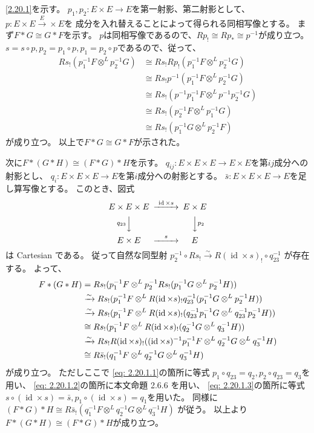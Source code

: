 \documentclass[uplatex,dvipdfmx]{jsarticle}
\makeatletter
\theoremstyle{definition}
\renewenvironment{proof}[1][\proofname]{
  \pushQED{\qed}%
  \normalfont \topsep6\p@\@plus6\p@\relax
  \trivlist
  \item[\hskip\labelsep
    #1\@addpunct{\textbf{.}}]\ignorespaces
}{%
  \popQED\endtrivlist\@endpefalse
}
\providecommand{\proofname}{証明}
\DeclareMathOperator{\id}{\mathrm{id}}
\makeatother
\begin{document}
\begin{proof}
  \ref{2.20.1}を示す。
  \(p_1,p_2:E\times E\to E\)を第一射影、第二射影として、
  \(p:E\times E\xrightarrow E\times E\)を
  成分を入れ替えることによって得られる同相写像とする。
  まず\(F*G\cong G*F\)を示す。
  \(p\)は同相写像であるので、\(Rp_! \cong Rp_*\cong p^{-1}\)が成り立つ。
  \(s = s\circ p, p_2 = p_1\circ p, p_1 = p_2\circ p\)であるので、従って、
  \begin{align*}
    Rs_!(p_1^{-1}F\otimes^L p_2^{-1}G)
    &\cong Rs_!Rp_!(p_1^{-1}F\otimes^L p_2^{-1}G) \\
    &\cong Rs_!p^{-1}(p_1^{-1}F\otimes^L p_2^{-1}G) \\
    &\cong Rs_!(p^{-1}p_1^{-1}F\otimes^L p^{-1}p_2^{-1}G) \\
    &\cong Rs_!(p_2^{-1}F\otimes^L p_1^{-1}G) \\
    &\cong Rs_!(p_1^{-1}G\otimes^L p_2^{-1}F)
  \end{align*}
  が成り立つ。
  以上で\(F*G\cong G*F\)が示された。

  次に\(F*(G*H)\cong (F*G)*H\)を示す。
  \(q_{ij}:E\times E\times E \to E\times E\)を第\(ij\)成分への射影とし、
  \(q_i:E\times E\times E \to E\)を第\(i\)成分への射影とする。
  \(\bar{s}:E\times E\times E \to E\)を足し算写像とする。
  このとき、図式
  \[
  \begin{CD}
    E\times E\times E @>{\id\times s}>> E\times E \\
    @V{q_{23}}VV @VV{p_2}V \\
    E\times E @>{s}>> E
  \end{CD}
  \]
  は Cartesian である。
  従って自然な同型射
  \(p_2^{-1}\circ Rs_!\xrightarrow{\sim} R(\id\times s)_!\circ q_{23}^{-1}\)
  が存在する。
  よって、
  \begin{align}
    F*(G*H)
    &= Rs_!(p_1^{-1}F\otimes^L p_2^{-1}Rs_!(p_1^{-1}G\otimes^L p_2^{-1}H)) \notag \\
    &\xrightarrow{\sim}
    Rs_!(p_1^{-1}F\otimes^L R(\id\times s)_!q_{23}^{-1}(p_1^{-1}G\otimes^L p_2^{-1}H))
    \notag \\
    &\xrightarrow{\sim}
    Rs_!(p_1^{-1}F\otimes^L R(\id\times s)_!
    (q_{23}^{-1}p_1^{-1}G\otimes^L q_{23}^{-1}p_2^{-1}H)) \notag \\
    &\cong Rs_!(p_1^{-1}F\otimes^L R(\id\times s)_!(q_2^{-1}G\otimes^L q_3^{-1}H))
    \label{eq: 2.20.1.1} \\
    &\xrightarrow{\sim}
    Rs_!R(\id\times s)_!((\id\times s)^{-1} p_1^{-1}F
    \otimes^L q_2^{-1}G\otimes^L q_3^{-1}H)
    \label{eq: 2.20.1.2} \\
    &\cong R\bar{s}_!(q_1^{-1}F \otimes^L q_2^{-1}G\otimes^L q_3^{-1}H)
    \label{eq: 2.20.1.3}
  \end{align}
  が成り立つ。
  ただしここで
  \eqref{eq: 2.20.1.1}の箇所に等式
  \(p_1\circ q_{23} = q_2, p_2\circ q_{23} = q_3\)を用い、
  \eqref{eq: 2.20.1.2}の箇所に本文命題 2.6.6 を用い、
  \eqref{eq: 2.20.1.3}の箇所に等式
  \(s\circ (\id\times s) = \bar{s}, p_1\circ (\id\times s) = q_1\)を用いた。
  同様に
  \((F*G)*H\cong R\bar{s}_!(q_1^{-1}F \otimes^L q_2^{-1}G\otimes^L q_3^{-1}H)\)
  が従う。
  以上より\(F*(G*H)\cong (F*G)*H\)が成り立つ。


\end{proof}
\end{document}
